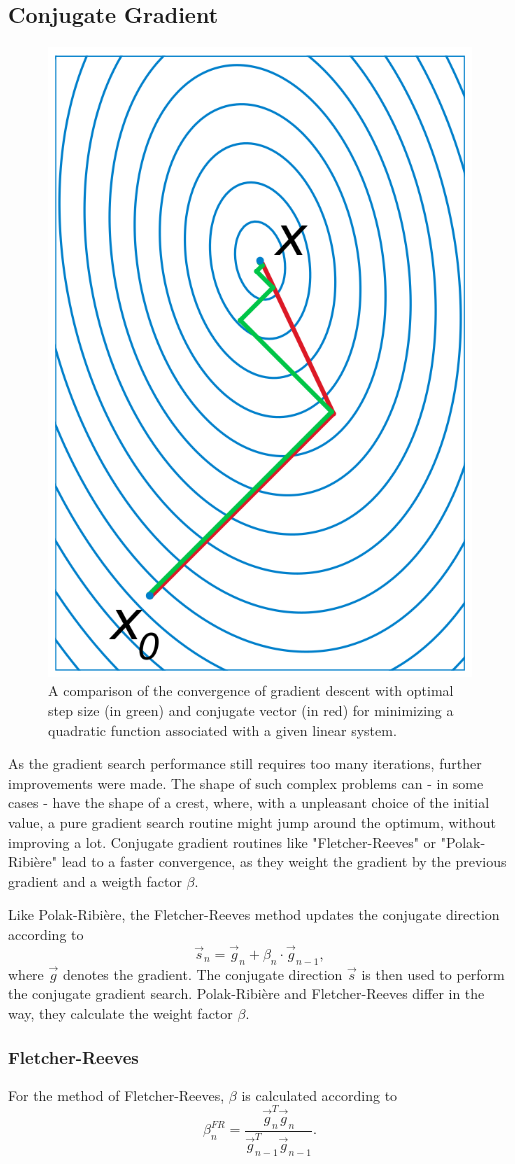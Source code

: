\subsection{Conjugate Gradient}
\label{sec:grads_conjgrad}
\begin{figure}[h]
\centering
\includegraphics[width=0.25\linewidth]{images/conjugate_gradient_example.png}
\caption{A comparison of the convergence of gradient descent with optimal step size (in green) and conjugate vector (in red) for minimizing a quadratic function associated with a given linear system\cite{wiki:conj_grad}.}
\label{fig:conj_grad_ex}
\end{figure}
As the gradient search performance still requires too many iterations, further improvements were made.
The shape of such complex problems can - in some cases - have the shape of a crest, where, with a unpleasant choice of the initial value, a pure gradient search routine might jump around the optimum, without improving a lot.
Conjugate gradient routines like "Fletcher-Reeves" or "Polak-Ribi\`{e}re" lead to a faster convergence, as they weight the gradient by the previous gradient and a weigth factor $\beta$. 

Like Polak-Ribi\`{e}re, the Fletcher-Reeves method updates the conjugate direction according to 
\begin{equation}
\vec{s}_n = \vec{g}_n + \beta_n\cdot\vec{g}_{n-1},
\label{eq:conj_update}
\end{equation}
where $\vec{g}$ denotes the gradient.
The conjugate direction $\vec{s}$ is then used to perform the conjugate gradient search.
Polak-Ribi\`{e}re and Fletcher-Reeves differ in the way, they calculate the weight factor $\beta$.

\subsubsection{Fletcher-Reeves}
For the method of Fletcher-Reeves, $\beta$ is calculated according to~\cite{Fletcher64}
\begin{equation}
\beta_n^{FR} = \frac{\vec{g}_n^T \vec{g}_n}{\vec{g}_{n-1}^T \vec{g}_{n-1}}.
\label{eq:beta_fr}
\end{equation}

